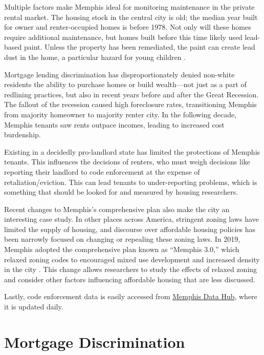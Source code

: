 \documentclass[
]{book}
\begin{document}
Multiple factors make Memphis ideal for monitoring maintenance in the private rental market. The housing stock in the central city is old; the median year built for owner and renter-occupied homes is before 1978. Not only will these homes require additional maintenance, but homes built before this time likely used lead-based paint. Unless the property has been remediated, the paint can create lead dust in the home, a particular hazard for young children \citep{cdc2020}.

Mortgage lending discrimination has disproportionately denied non-white residents the ability to purchase homes or build wealth---not just as a part of redlining practices, but also in recent years before and after the Great Recession. The fallout of the recession caused high foreclosure rates, transitioning Memphis from majority homeowner to majority renter city. In the following decade, Memphis tenants saw rents outpace incomes, leading to increased cost burdenship.

Existing in a decidedly pro-landlord state has limited the protections of Memphis tenants. This influences the decisions of renters, who must weigh decisions like reporting their landlord to code enforcement at the expense of retaliation/eviction. This can lead tenants to under-reporting problems, which is something that should be looked for and measured by housing researchers.

Recent changes to Memphis's comprehensive plan also make the city an interesting case study. In other places across America, stringent zoning laws have limited the supply of housing, and discourse over affordable housing policies has been narrowly focused on changing or repealing these zoning laws. In 2019, Memphis adopted the comprehensive plan known as ``Memphis 3.0,'' which relaxed zoning codes to encouraged mixed use development and increased density in the city \citep{memphis30}. This change allows researchers to study the effects of relaxed zoning and consider other factors influencing affordable housing that are less discussed.

Lastly, code enforcement data is easily accessed from \href{https://data.memphistn.gov/dataset/Service-Requests-since-2016/hmd4-ddta}{Memphis Data Hub}, where it is updated daily.

\hypertarget{mortgage-discrimination}{%
\section{Mortgage Discrimination}\label{mortgage-discrimination}}
\end{document}
